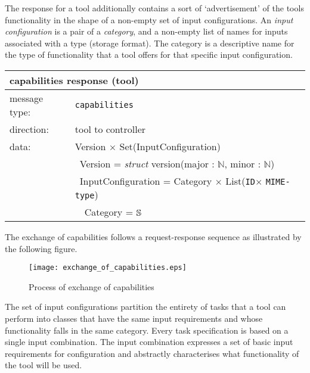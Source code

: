 \documentclass{article}
\newcommand{\msg}[1]{\texttt{#1}}
\newcommand{\String}{\ensuremath \mathbb{S}\xspace}
\newcommand{\Id}{\texttt{ID}\xspace}
\newcommand{\MIMEtype}{\texttt{MIME-type}\xspace}
\begin{document}
   \noindent The response for a tool additionally contains a sort of
   `advertisement' of the tools functionality in the shape of a non-empty set
   of input configurations.  An \textit{input configuration} is a pair of a
   \textit{category}, and a non-empty list of names for inputs associated with
   a type (storage format).  The category is a descriptive name for the type of
   functionality that a tool offers for that specific input configuration.
   
   \begin{table}[H]
    \begin{center}
     \begin{tabular}{|ll|}
      \hline
       \multicolumn{2}{|l|}{\textbf{capabilities response (tool)}} \\
      \hline
       message type:   & \msg{capabilities} \\
      \hline
       direction:      & tool to controller \\
      \hline
       data:           & Version $\times$ Set(InputConfiguration) \\
                       & \ Version = \textit{struct} version(major : $\mathbb{N}$, minor : $\mathbb{N}$) \\
                       & \ InputConfiguration = Category $\times$ List(\Id $\times$ \MIMEtype) \\
                       & \ \ Category = $\String$ \\
      \hline
     \end{tabular}
    \end{center}
    \vspace{-0.5cm}
   \end{table}

   \noindent The exchange of capabilities follows a request-response sequence
   as illustrated by the following figure.
   
   \begin{figure}[H]
    \vspace{-0.4cm}
    \begin{center}
     \texttt{[image: exchange\_of\_capabilities.eps]}
    \end{center}
    \vspace{-0.7cm}
    \caption{Process of exchange of capabilities}
   \end{figure}

   \noindent The set of input configurations partition the entirety of tasks
   that a tool can perform into classes that have the same input requirements
   and whose functionality falls in the same category. Every task specification
   is based on a single input combination. The input combination expresses a
   set of basic input requirements for configuration and abstractly
   characterises what functionality of the tool will be used.
   
\end{document}

